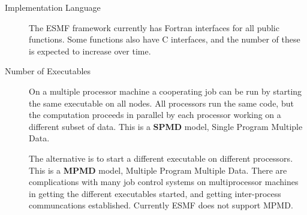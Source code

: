 \begin{description}
\item[Implementation Language]

The ESMF framework currently has Fortran interfaces for all public functions. 
Some functions also have C interfaces, and the number of these is expected to 
increase over time. 


\item[Number of Executables]

On a multiple processor machine a cooperating job can be run 
by starting the same executable on all nodes.  All processors run the
same code, but the computation proceeds in parallel by each processor 
working on a different subset of data.  This is a {\bf SPMD} model, 
Single Program Multiple Data.  

The alternative is to start a different executable on different
processors.  This is a {\bf MPMD} model, Multiple Program Multiple Data.
There are complications with many job control systems on multiprocessor
machines in getting the different executables started, and getting
inter-process communcations established.  Currently ESMF does not
support MPMD.

\end{description}



